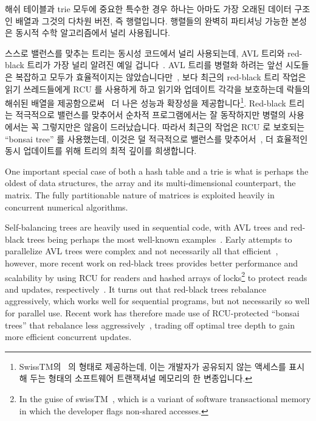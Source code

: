 \fi

해쉬 테이블과 trie 모두에 중요한 특수한 경우 하나는 아마도 가장 오래된 데이터
구조인 배열과 그것의 다차원 버전, 즉 행렬입니다.
행렬들의 완벽히 파티셔닝 가능한 본성은 동시적 수학 알고리즘에서 널리
사용됩니다.

스스로 밸런스를 맞추는 트리는 동시성 코드에서 널리 사용되는데, AVL 트리와
red-black 트리가 가장 널리 알려진 예일
겁니다~\cite{ThomasHCorman2001Algorithms}.
AVL 트리를 병렬화 하려는 앞선 시도들은 복잡하고 모두가 효율적이지는
않았습니다만~\cite{Ellis80}, 보다 최근의 red-black 트리 작업은 읽기
쓰레드들에게 RCU 를 사용하게 하고 읽기와 업데이트 각각을 보호하는데 락들의
해쉬된 배열을
제공함으로써~\cite{PhilHoward2011RCUTMRBTree,PhilipWHoward2013RCUrbtree} 더
나은 성능과 확장성을 제공합니다\footnote{
	SwissTM의~\cite{AleksandarDragovejic2011STMnotToy} 의 형태로
	제공하는데, 이는 개발자가 공유되지 않는 액세스를 표시해 두는 형태의
	소프트웨어 트랜잭셔널 메모리의 한 변종입니다.}.
Red-black 트리는 적극적으로 밸런스를 맞추어서 순차적 프로그램에서는 잘
동작하지만 병렬의 사용에서는 꼭 그렇지만은 않음이 드러났습니다.
따라서 최근의 작업은 RCU 로 보호되는 ``bonsai tree'' 를 사용했는데, 이것은 덜
적극적으로 밸런스를 맞추어서~\cite{AustinClements2012RCULinux:mmapsem}, 더
효율적인 동시 업데이트를 위해 트리의 최적 깊이를 희생합니다.

\iffalse

One important special case of both a hash table and a trie is what is
perhaps the oldest of data structures, the array and its multi-dimensional
counterpart, the matrix.
The fully partitionable nature of matrices is exploited heavily in
concurrent numerical algorithms.

Self-balancing trees are heavily used in sequential code, with
AVL trees and red-black trees being perhaps the most well-known
examples~\cite{ThomasHCorman2001Algorithms}.
Early attempts to parallelize AVL trees were complex and not necessarily
all that efficient~\cite{Ellis80},
however, more recent work on red-black trees provides better
performance and scalability by using RCU for readers and hashed arrays
of locks\footnote{
	In the guise of swissTM~\cite{AleksandarDragovejic2011STMnotToy},
	which is a variant of software transactional memory in which
	the developer flags non-shared accesses.}
to protect reads and updates,
respectively~\cite{PhilHoward2011RCUTMRBTree,PhilipWHoward2013RCUrbtree}.
It turns out that red-black trees rebalance aggressively, which works
well for sequential programs, but not necessarily so well for parallel
use.
Recent work has therefore made use of RCU-protected ``bonsai trees''
that rebalance less aggressively~\cite{AustinClements2012RCULinux:mmapsem},
trading off optimal tree depth to gain more efficient concurrent updates.

